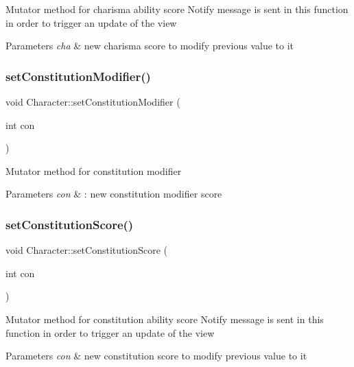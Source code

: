 Mutator method for charisma ability score Notify message is sent in this function in order to trigger an update of the view 
\begin{DoxyParams}{Parameters}
{\em cha} & new charisma score to modify previous value to it \\
\hline
\end{DoxyParams}
\hypertarget{class_character_ac550c6455f74ecbac744523fa82148c3}{}\label{class_character_ac550c6455f74ecbac744523fa82148c3} 
\subsubsection{\texorpdfstring{set\+Constitution\+Modifier()}{setConstitutionModifier()}}
{\footnotesize\ttfamily void Character\+::set\+Constitution\+Modifier (\begin{DoxyParamCaption}\item[{int}]{con }\end{DoxyParamCaption})}

Mutator method for constitution modifier 
\begin{DoxyParams}{Parameters}
{\em con} & \+: new constitution modifier score \\
\hline
\end{DoxyParams}
\hypertarget{class_character_a959e82d760840d33ab95a264c549a8c6}{}\label{class_character_a959e82d760840d33ab95a264c549a8c6} 
\subsubsection{\texorpdfstring{set\+Constitution\+Score()}{setConstitutionScore()}}
{\footnotesize\ttfamily void Character\+::set\+Constitution\+Score (\begin{DoxyParamCaption}\item[{int}]{con }\end{DoxyParamCaption})}

Mutator method for constitution ability score Notify message is sent in this function in order to trigger an update of the view 
\begin{DoxyParams}{Parameters}
{\em con} & new constitution score to modify previous value to it \\
\hline
\end{DoxyParams}
\hypertarget{class_character_a5a60696b6a658e78a08b3c098e1446d6}{}\label{class_character_a5a60696b6a658e78a08b3c098e1446d6} 
